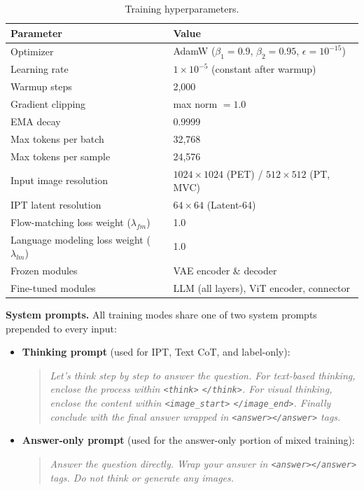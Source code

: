 \documentclass{llmxive}
\begin{document}
\begin{table}[h]
\centering
\small
\begin{tabular}{ll}
\toprule
\textbf{Parameter} & \textbf{Value} \\
\midrule
Optimizer & AdamW ($\beta_1{=}0.9$, $\beta_2{=}0.95$, $\epsilon{=}10^{-15}$) \\
Learning rate & $1 \times 10^{-5}$ (constant after warmup) \\
Warmup steps & 2{,}000 \\
Gradient clipping & max norm $= 1.0$ \\
EMA decay & 0.9999 \\
\midrule
Max tokens per batch & 32{,}768 \\
Max tokens per sample & 24{,}576 \\
Input image resolution & $1024 \times 1024$ (PET) / $512 \times 512$ (PT, MVC) \\
IPT latent resolution & $64 \times 64$ (Latent-64) \\
\midrule
Flow-matching loss weight ($\lambda_{fm}$) & 1.0 \\
Language modeling loss weight ($\lambda_{lm}$) & 1.0 \\
\midrule
Frozen modules & VAE encoder \& decoder \\
Fine-tuned modules & LLM (all layers), ViT encoder, connector \\
\bottomrule
\end{tabular}
\caption{Training hyperparameters.}
\label{tab:supp_hyperparams}
\end{table}

\noindent\textbf{System prompts.}
All training modes share one of two system prompts prepended to every input:

\begin{itemize}
    \item \textbf{Thinking prompt} (used for IPT, Text CoT, and label-only):

    \begin{quote}\small
    \textit{Let's think step by step to answer the question. For text-based thinking, enclose the process within \texttt{<think>} \texttt{</think>}. For visual thinking, enclose the content within \texttt{<image\_start>} \texttt{</image\_end>}. Finally conclude with the final answer wrapped in \texttt{<answer></answer>} tags.}
    \end{quote}

    \item \textbf{Answer-only prompt} (used for the answer-only portion of mixed training):

    \begin{quote}\small
    \textit{Answer the question directly. Wrap your answer in \texttt{<answer></answer>} tags. Do not think or generate any images.}
    \end{quote}
\end{itemize}
\end{document}
